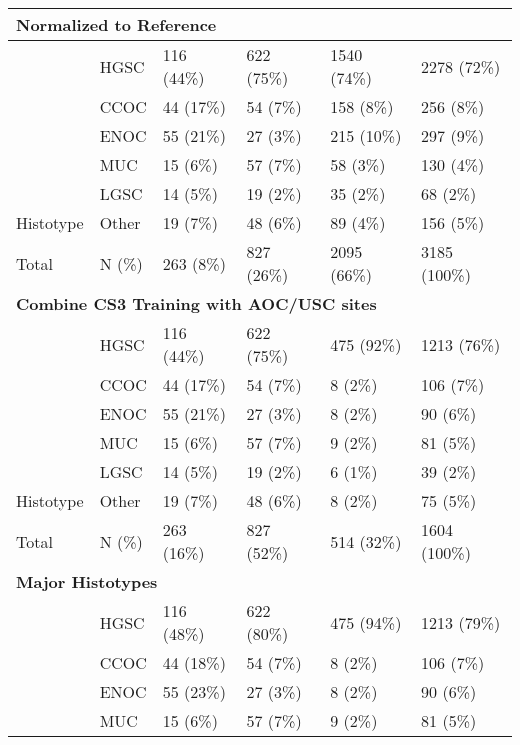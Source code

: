 \documentclass[
]{report}
\begin{document}
\begin{table}
\begin{tabular}[t]{l|l|l|l|l|l}
\cline{1-6}
\multicolumn{6}{l}{\textbf{Normalized to Reference}}\\
\hline
 & HGSC & 116 (44\%) & 622 (75\%) & 1540 (74\%) & 2278 (72\%)\\
\cline{2-6}
 & CCOC & 44 (17\%) & 54 (7\%) & 158 (8\%) & 256 (8\%)\\
\cline{2-6}
 & ENOC & 55 (21\%) & 27 (3\%) & 215 (10\%) & 297 (9\%)\\
\cline{2-6}
 & MUC & 15 (6\%) & 57 (7\%) & 58 (3\%) & 130 (4\%)\\
\cline{2-6}
 & LGSC & 14 (5\%) & 19 (2\%) & 35 (2\%) & 68 (2\%)\\
\cline{2-6}
\multirow{-6}{*}{\raggedright\arraybackslash \hspace{1em}Histotype} & Other & 19 (7\%) & 48 (6\%) & 89 (4\%) & 156 (5\%)\\
\cline{1-6}
\hspace{1em}Total & N (\%) & 263 (8\%) & 827 (26\%) & 2095 (66\%) & 3185 (100\%)\\
\cline{1-6}
\multicolumn{6}{l}{\textbf{Combine CS3 Training with AOC/USC sites}}\\
\hline
 & HGSC & 116 (44\%) & 622 (75\%) & 475 (92\%) & 1213 (76\%)\\
\cline{2-6}
 & CCOC & 44 (17\%) & 54 (7\%) & 8 (2\%) & 106 (7\%)\\
\cline{2-6}
 & ENOC & 55 (21\%) & 27 (3\%) & 8 (2\%) & 90 (6\%)\\
\cline{2-6}
 & MUC & 15 (6\%) & 57 (7\%) & 9 (2\%) & 81 \vphantom{1} (5\%)\\
\cline{2-6}
 & LGSC & 14 (5\%) & 19 (2\%) & 6 (1\%) & 39 (2\%)\\
\cline{2-6}
\multirow{-6}{*}{\raggedright\arraybackslash \hspace{1em}Histotype} & Other & 19 (7\%) & 48 (6\%) & 8 (2\%) & 75 (5\%)\\
\cline{1-6}
\hspace{1em}Total & N (\%) & 263 (16\%) & 827 (52\%) & 514 (32\%) & 1604 (100\%)\\
\cline{1-6}
\multicolumn{6}{l}{\textbf{Major Histotypes}}\\
\hline
 & HGSC & 116 (48\%) & 622 (80\%) & 475 (94\%) & 1213 (79\%)\\
\cline{2-6}
 & CCOC & 44 (18\%) & 54 (7\%) & 8 (2\%) & 106 (7\%)\\
\cline{2-6}
 & ENOC & 55 (23\%) & 27 (3\%) & 8 (2\%) & 90 (6\%)\\
\cline{2-6}
 & MUC & 15 (6\%) & 57 (7\%) & 9 (2\%) & 81 (5\%)\\

\end{tabular}
\end{table}
\end{document}
